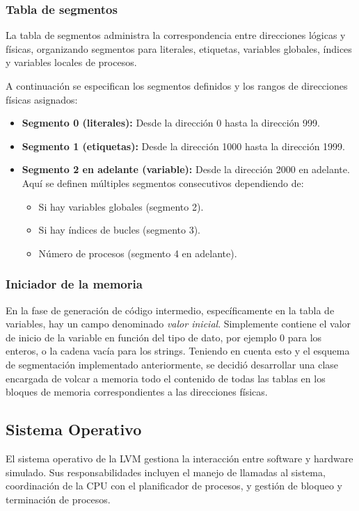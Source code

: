\subsubsection{Tabla de segmentos}\label{subsubsec:pageTableLVM}
La tabla de segmentos administra la correspondencia entre direcciones lógicas y físicas, organizando segmentos para literales, etiquetas, variables globales, índices y variables locales de procesos.


A continuación se especifican los segmentos definidos y los rangos de direcciones físicas asignados:

\begin{itemize}
    \item \textbf{Segmento 0 (literales):} Desde la dirección 0 hasta la dirección 999.
    \item \textbf{Segmento 1 (etiquetas):} Desde la dirección 1000 hasta la dirección 1999.
    \item \textbf{Segmento 2 en adelante (variable):} Desde la dirección 2000 en adelante. Aquí se definen múltiples segmentos consecutivos dependiendo de:
    \begin{itemize}
        \item Si hay variables globales (segmento 2).
        \item Si hay índices de bucles (segmento 3).
        \item Número de procesos (segmento 4 en adelante).
    \end{itemize}
\end{itemize}

\subsubsection{Iniciador de la memoria}
En la fase de generación de código intermedio, específicamente en la tabla de variables, hay un campo denominado \textit{valor inicial}. Simplemente contiene el valor de inicio de la variable en función del tipo de dato, por ejemplo 0 para los enteros, o la cadena vacía para los strings. Teniendo en cuenta esto y el esquema de segmentación implementado anteriormente, se decidió desarrollar una clase encargada de volcar a memoria todo el contenido de todas las tablas en los bloques de memoria correspondientes a las direcciones físicas.

\subsection{Sistema Operativo}\label{subsec:SOLVM}
El sistema operativo de la LVM gestiona la interacción entre software y hardware simulado. Sus responsabilidades incluyen el manejo de llamadas al sistema, coordinación de la CPU con el planificador de procesos, y gestión de bloqueo y terminación de procesos.

